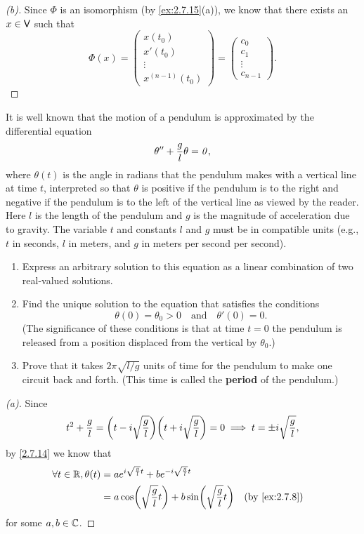 \begin{proof}[(b)]
	Since \(\Phi\) is an isomorphism (by \cref{ex:2.7.15}(a)), we know that there exists an \(x \in \mathsf{V}\) such that
	\[
		\Phi(x) = \begin{pmatrix}
			x(t_0)  \\
			x'(t_0) \\
			\vdots  \\
			x^{(n - 1)}(t_0)
		\end{pmatrix} = \begin{pmatrix}
			c_0    \\
			c_1    \\
			\vdots \\
			c_{n - 1}
		\end{pmatrix}.
	\]
\end{proof}

\begin{ex}\label{ex:2.7.16}
	It is well known that the motion of a pendulum is approximated by the differential equation
	\[
		\theta'' + \frac{g}{l} \theta = \mathit{0},
	\]
	where \(\theta(t)\) is the angle in radians that the pendulum makes with a vertical line at time \(t\), interpreted so that \(\theta\) is positive if the pendulum is to the right and negative if the pendulum is to the left of the vertical line as viewed by the reader.
	Here \(l\) is the length of the pendulum and \(g\) is the magnitude of acceleration due to gravity.
	The variable \(t\) and constants \(l\) and \(g\) must be in compatible units
	(e.g., \(t\) in seconds, \(l\) in meters, and \(g\) in meters per second per second).
	\begin{enumerate}
		\item Express an arbitrary solution to this equation as a linear combination of two real-valued solutions.
		\item Find the unique solution to the equation that satisfies the conditions
		      \[
			      \theta(0) = \theta_0 > 0 \quad \text{and} \quad \theta'(0) = 0.
		      \]
		      (The significance of these conditions is that at time \(t = 0\) the pendulum is released from a position displaced from the vertical by \(\theta_0\).)
		\item Prove that it takes \(2 \pi \sqrt{l / g}\) units of time for the pendulum to make one circuit back and forth.
		      (This time is called the \textbf{period} of the pendulum.)
	\end{enumerate}
\end{ex}

\begin{proof}[(a)]
	Since
	\[
		t^2 + \frac{g}{l} = \pa{t - i \sqrt{\frac{g}{l}}} \pa{t + i \sqrt{\frac{g}{l}}} = 0 \implies t = \pm i \sqrt{\frac{g}{l}},
	\]
	by \cref{2.7.14} we know that
	\begin{align*}
		\forall t \in \R, \theta(t) & = a e^{i \sqrt{\frac{g}{l}} t} + b e^{- i \sqrt{\frac{g}{l}} t}                        \\
		                            & = a \cos\pa{\sqrt{\frac{g}{l}} t} + b \sin\pa{\sqrt{\frac{g}{l}} t} &  & \by{ex:2.7.8}
	\end{align*}
	for some \(a, b \in \mathbb{C}\).
\end{proof}

